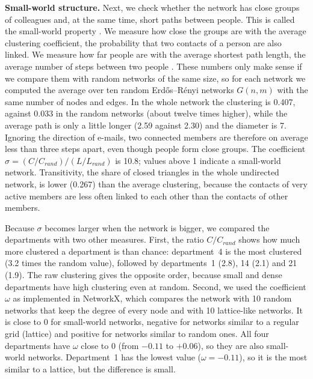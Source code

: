 \documentclass[12pt, a4paper]{article}
\begin{document}
\textbf{Small-world structure.} Next, we check whether the network has close
groups of colleagues and, at the same time, short paths between people. This is
called the small-world property \cite{watts1998}. We measure how close the
groups are with the average clustering coefficient, the probability that two
contacts of a person are also linked. We measure how far people are with the
average shortest path length, the average number of steps between two people
\cite{newman2018}. These numbers only make sense if we compare them with random
networks of the same size, so for each network we computed the average over
ten random Erdős–Rényi networks $G(n,m)$ with the same number of nodes and
edges. In the whole network the clustering is 0.407, against 0.033 in the
random networks (about twelve times higher), while the average path is only a
little longer (2.59 against 2.30) and the diameter is 7. Ignoring the direction
of e-mails, two connected members are therefore on average less than three
steps apart, even though people form close groups. The coefficient
$\sigma = (C/C_{rand})/(L/L_{rand})$ is 10.8; values above 1 indicate a
small-world network. Transitivity, the share of closed triangles in the whole
undirected network, is lower (0.267) than the average clustering, because the
contacts of very active members are less often linked to each other than the
contacts of other members.

Because $\sigma$ becomes larger when the network is bigger, we compared the
departments with two other measures. First, the ratio $C/C_{rand}$ shows how
much more clustered a department is than chance: department~4 is the most
clustered (3.2 times the random value), followed by departments~1 (2.8), 14
(2.1) and 21 (1.9). The raw clustering gives the opposite order, because small
and dense departments have high clustering even at random. Second, we used the
coefficient $\omega$ as implemented in NetworkX, which compares the network
with 10 random networks that keep the degree of every node and with 10
lattice-like networks. It is close to 0 for small-world networks, negative for
networks similar to a regular grid (lattice) and positive for networks similar
to random ones. All four departments have $\omega$ close to 0 (from $-0.11$ to
$+0.06$), so they are also small-world networks. Department~1 has the lowest
value ($\omega=-0.11$), so it is the most similar to a lattice, but the
difference is small.
\end{document}
